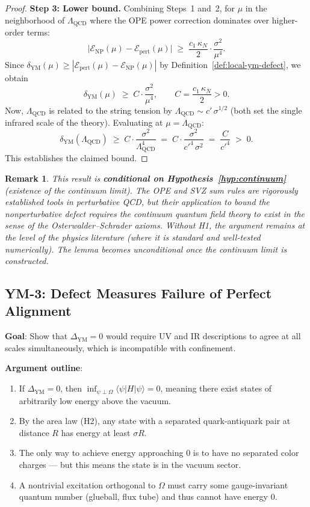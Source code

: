 \documentclass[11pt]{article}
\newtheorem{remark}[lemma]{Remark}
\theoremstyle{definition}
\begin{document}
\begin{proof}
\medskip
\noindent\textbf{Step 3: Lower bound.}
Combining Steps~1 and~2, for $\mu$ in the neighborhood of $\Lambda_{\mathrm{QCD}}$
where the OPE power correction dominates over higher-order terms:
\[
  \bigl|\mathcal{E}_{\mathrm{NP}}(\mu) - \mathcal{E}_{\mathrm{pert}}(\mu)\bigr|
  \;\geq\; \frac{c_1\, \kappa_N}{2} \cdot \frac{\sigma^2}{\mu^4}.
\]
Since $\delta_{\mathrm{YM}}(\mu) \geq
|\mathcal{E}_{\mathrm{pert}}(\mu) - \mathcal{E}_{\mathrm{NP}}(\mu)|$
by Definition~\ref{def:local-ym-defect}, we obtain
\[
  \delta_{\mathrm{YM}}(\mu) \;\geq\; C \cdot \frac{\sigma^2}{\mu^4},
  \qquad C = \frac{c_1\, \kappa_N}{2} > 0.
\]
Now, $\Lambda_{\mathrm{QCD}}$ is related to the string tension by
$\Lambda_{\mathrm{QCD}} \sim c'\, \sigma^{1/2}$ (both set the single
infrared scale of the theory).  Evaluating at $\mu = \Lambda_{\mathrm{QCD}}$:
\[
  \delta_{\mathrm{YM}}(\Lambda_{\mathrm{QCD}})
  \;\geq\; C \cdot \frac{\sigma^2}{\Lambda_{\mathrm{QCD}}^4}
  \;=\; C \cdot \frac{\sigma^2}{c'^4\, \sigma^2}
  \;=\; \frac{C}{c'^4}
  \;>\; 0.
\]
This establishes the claimed bound.
\end{proof}

\begin{remark}
This result is \textbf{conditional on Hypothesis~\ref{hyp:continuum}}
(existence of the continuum limit).  The OPE and SVZ sum rules are
rigorously established tools in perturbative QCD, but their application
to bound the nonperturbative defect requires the continuum quantum field
theory to exist in the sense of the Osterwalder--Schrader axioms.
Without H1, the argument remains at the level of the physics literature
(where it is standard and well-tested numerically).  The lemma becomes
unconditional once the continuum limit is constructed.
\end{remark}

\subsection{YM-3: Defect Measures Failure of Perfect Alignment}

\textbf{Goal}: Show that $\Delta_{\mathrm{YM}} = 0$ would require UV and IR descriptions
to agree at all scales simultaneously, which is incompatible with confinement.

\textbf{Argument outline}:
\begin{enumerate}
  \item If $\Delta_{\mathrm{YM}} = 0$, then $\inf_{\psi \perp \Omega} \langle \psi | H | \psi \rangle = 0$,
    meaning there exist states of arbitrarily low energy above the vacuum.
  \item By the area law (H2), any state with a separated quark-antiquark pair
    at distance $R$ has energy at least $\sigma R$.
  \item The only way to achieve energy approaching 0 is to have no separated color charges ---
    but this means the state is in the vacuum sector.
  \item A nontrivial excitation orthogonal to $\Omega$ must carry some gauge-invariant
    quantum number (glueball, flux tube) and thus cannot have energy 0.
\end{enumerate}
\end{document}
